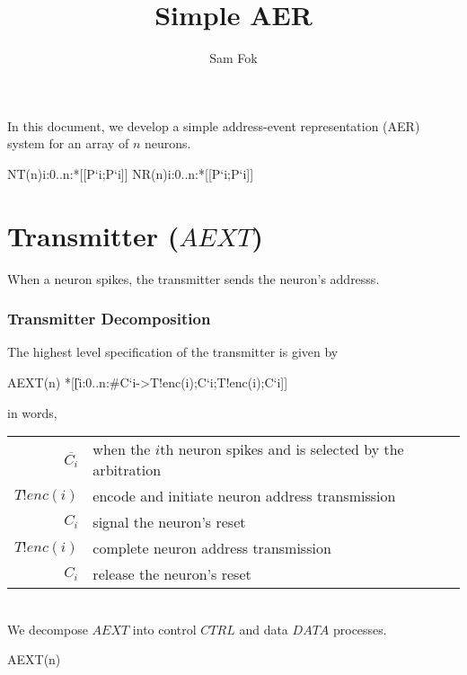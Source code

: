 \documentclass{article}
\begin{document}
\title{Simple AER}
\author{Sam Fok}
\maketitle

In this document, we develop a simple address-event representation (AER) system for an array of $n$ neurons.

\begin{csp}
NT(n)\equiv\langle\pll\!i:0..n:*[[P`i;P`i]]\rangle
NR(n)\equiv\langle\pll\!i:0..n:*[[P`i;P`i]]\rangle
\end{csp}
\part{Transmitter ($AEXT$)}

When a neuron spikes, the transmitter sends the neuron's addresss.

\section{Transmitter Decomposition}

The highest level specification of the transmitter is given by

\begin{csp}
AEXT(n)\equiv
  *[[\langle\|\!i:0..n:#{C`i}->T!enc(i);C`i;T!enc(i);C`i]]
\end{csp}

\noindent in words,

\begin{tabular}[]{rl}
  $\overline{C_i}$ & when the $i$th neuron spikes and is selected by the arbitration \\
  $T!enc(i)$ & encode and initiate neuron address transmission \\
  $C_i$ & signal the neuron's reset \\
  $T!enc(i)$ & complete neuron address transmission \\
  $C_i$ & release the neuron's reset \\
\end{tabular} \\

\noindent We decompose $AEXT$ into control $CTRL$ and data $DATA$ processes.

\begin{csp}
AEXT(n)
\end{csp}
\end{document}
